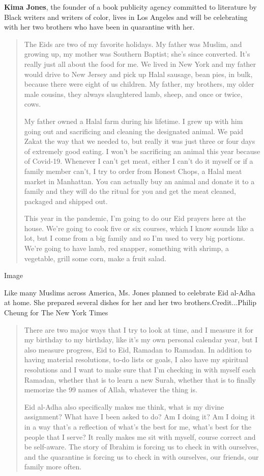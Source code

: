 \textbf{Kima Jones}, the founder of a book publicity agency committed to
literature by Black writers and writers of color, lives in Los Angeles
and will be celebrating with her two brothers who have been in
quarantine with her.

\begin{quote}
The Eids are two of my favorite holidays. My father was Muslim, and
growing up, my mother was Southern Baptist; she's since converted. It's
really just all about the food for me. We lived in New York and my
father would drive to New Jersey and pick up Halal sausage, bean pies,
in bulk, because there were eight of us children. My father, my
brothers, my older male cousins, they always slaughtered lamb, sheep,
and once or twice, cows.

My father owned a Halal farm during his lifetime. I grew up with him
going out and sacrificing and cleaning the designated animal. We paid
Zakat the way that we needed to, but really it was just three or four
days of extremely good eating. I won't be sacrificing an animal this
year because of Covid-19. Whenever I can't get meat, either I can't do
it myself or if a family member can't, I try to order from Honest Chops,
a Halal meat market in Manhattan. You can actually buy an animal and
donate it to a family and they will do the ritual for you and get the
meat cleaned, packaged and shipped out.

This year in the pandemic, I'm going to do our Eid prayers here at the
house. We're going to cook five or six courses, which I know sounds like
a lot, but I come from a big family and so I'm used to very big
portions. We're going to have lamb, red snapper, something with shrimp,
a vegetable, grill some corn, make a fruit salad.
\end{quote}

Image

Like many Muslims across America, Ms. Jones planned to celebrate Eid
al-Adha at home. She prepared several dishes for her and her two
brothers.Credit...Philip Cheung for The New York Times

\begin{quote}
There are two major ways that I try to look at time, and I measure it
for my birthday to my birthday, like it's my own personal calendar year,
but I also measure progress, Eid to Eid, Ramadan to Ramadan. In addition
to having material resolutions, to-do lists or goals, I also have my
spiritual resolutions and I want to make sure that I'm checking in with
myself each Ramadan, whether that is to learn a new Surah, whether that
is to finally memorize the 99 names of Allah, whatever the thing is.

Eid al-Adha also specifically makes me think, what is my divine
assignment? What have I been asked to do? Am I doing it? Am I doing it
in a way that's a reflection of what's the best for me, what's best for
the people that I serve? It really makes me sit with myself, course
correct and be self-aware. The story of Ibrahim is forcing us to check
in with ourselves, and the quarantine is forcing us to check in with
ourselves, our friends, our family more often.
\end{quote}

